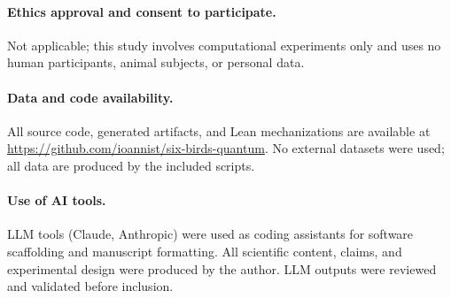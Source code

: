 \paragraph{Ethics approval and consent to participate.}
Not applicable; this study involves computational experiments only and uses no human participants, animal subjects, or personal data.

\paragraph{Data and code availability.}
All source code, generated artifacts, and Lean mechanizations are available at \url{https://github.com/ioannist/six-birds-quantum}. No external datasets were used; all data are produced by the included scripts.

\paragraph{Use of AI tools.}
LLM tools (Claude, Anthropic) were used as coding assistants for software scaffolding and manuscript formatting. All scientific content, claims, and experimental design were produced by the author. LLM outputs were reviewed and validated before inclusion.
